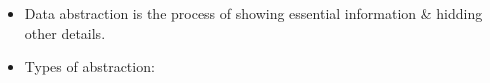 \setlength{\columnsep}{3pt}
\begin{flushleft}
	
	\begin{itemize}
		\item Data abstraction is the process of showing essential information \& hidding other details.
		\item Types of abstraction:
	\end{itemize}	
	
\end{flushleft}

\newpage